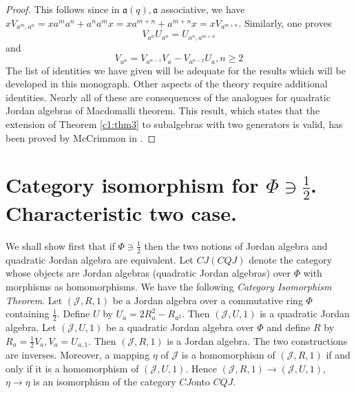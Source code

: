 \begin{proof}
This follows since in $\mathfrak{a}(q), \mathfrak{a}$ associative, we have $x
V_{a^{m},a^{n}}=xa^{m}a^{n}+a^{n}a^{m}x=xa^{m+n}+a^{m+n}x=xV_{a^{m+n}}$. Similarly,
one proves 
\begin{equation*}
V_{a^{n}}U_{a^{n}}=U_{a^{n},a^{m+n}}\tag{QJ 39}
\end{equation*}\pageoriginale
and
\begin{equation*}
V_{a^{n}}=V_{a^{n-1}}V_a-V_{a^{n-2}}U_a, n\ge 2\tag*{QJ 40}
\end{equation*}
The list of identities we have given will be adequate for the results
which will be developed in this monograph. Other aspects of the theory
require additional identities. Nearly all of these are consequences of
the analogues for quadratic Jordan algebras of Macdomalli
theorem. This result, which states that the extension of Theorem \ref{c1:thm3}
to subalgebras with two generators is valid, has been proved by
McCrimmon in \cite{McCrimmon3}. 
\end{proof}


\section{Category isomorphism for $\Phi\ni\frac{1}{2}$. Characteristic
  two case.}\label{c1:sec4} 

We shall show first that if $\Phi \ni\frac{1}{2}$ then the two notions
of Jordan algebra and quadratic Jordan algebra are equivalent. Let
$CJ(CQJ)$ denote the category whose objects are Jordan algebras
(quadratic Jordan algebras) over $\Phi$ with morphisms as
homomorphisms. We have the following {\em Category Isomorphism
  Theorem}. Let $(\mathscr{J},R,1)$ be a Jordan algebra over a
commutative ring $\Phi$ containing $\frac{1}{2}$. Define $U$ by
$U_a=2R_a^{2}-R_{a^{2}}$. Then $(\mathscr{J},U,1)$ is a quadratic
Jordan algebra. Let $(\mathscr{J},U,1)$ be a quadratic Jordan algebra
over $\Phi$ and define $R$ by $R_a=\frac{1}{2}V_a,V_a=U_{a,1}$. Then
$(\mathscr{J}, R,1)$ is a Jordan algebra. The two constructions are
inverses. Moreover, a mapping $\eta$ of $\mathscr{J}$ is a
homomorphism of $(\mathscr{J},R,1)$ if and only if it is a
homomorphism of $(\mathscr{J},U,1)$. Hence
$(\mathscr{J},R,1)\to(\mathscr{J},U,1)$, $\eta\to\eta$ is an isomorphism
of the category $CJ$\pageoriginale onto $CQJ$. 

